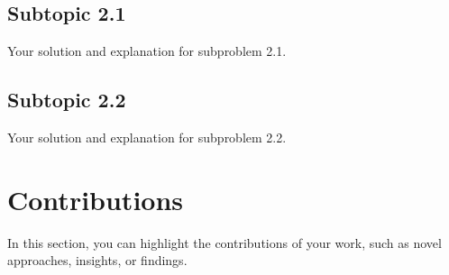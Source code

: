 \documentclass[12pt]{article}
\begin{document}
\subsection{Subtopic 2.1}
Your solution and explanation for subproblem 2.1.

\begin{figure}[h]
 
\end{figure}

\subsection{Subtopic 2.2}
Your solution and explanation for subproblem 2.2.

\section{Contributions}
In this section, you can highlight the contributions of your work, such as novel approaches, insights, or findings.

  
\end{document}

